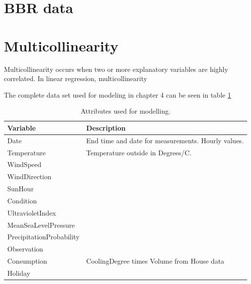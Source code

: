 \section{BBR data}

\section{Multicollinearity}
Multicollinearity occurs when two or more explanatory variables are highly correlated. In linear regression, multicollinearity 



\noindent The complete data set used for modeling in chapter 4 can be seen in table \ref{tab: modeldata} 
\begin{table}[H]
    \centering
    \begin{tabular}{ll}
     \hline
     \textbf{Variable} & \textbf{Description} \\
    \hline
    \hline
    Date  &  End time and date for measurements. Hourly values.\\
    Temperature  &  Temperature outside in Degrees/C. \\
    WindSpeed  &  \\
    WindDirection  &  \\
    SunHour  &  \\
    Condition  & \\
    UltravioletIndex  &   \\
    MeanSeaLevelPressure  & \\
    PrecipitationProbability & \\
    Observation & \\
    Consumption & CoolingDegree times Volume from House data \\
    Holiday & \\
    \hline
    \end{tabular}
    \caption{Attributes used for modelling.}
    \label{tab: modeldata}
\end{table}   